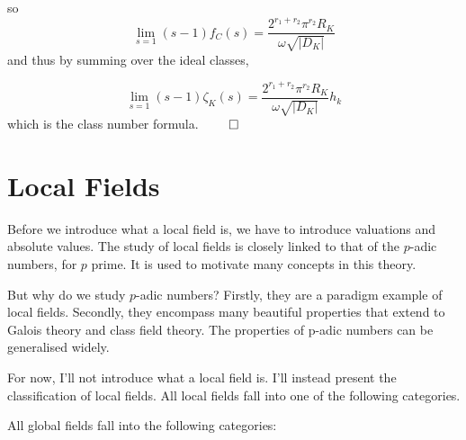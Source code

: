 \documentclass[a4paper, 12pt,oneside,openany]{book}
\begin{document}
so $$\lim\limits_{s=1}(s-1)f_C(s) = \frac{2^{r_1+r_2}\pi^{r_2} R_K}{\omega \sqrt{|D_K|}}$$ and thus by summing over the ideal classes,

$$\lim\limits_{s=1}(s-1)\zeta_K(s) = \frac{2^{r_1+r_2}\pi^{r_2} R_K}{\omega \sqrt{|D_K|}} h_k$$ which is the class number formula. $\qed$



\chapter{Local Fields}
\minitoc

Before we introduce what a local field is, we have to introduce valuations and absolute values. The study of local fields is closely linked to that of the $p$-adic numbers, for $p$ prime. It is used to motivate many concepts in this theory.

But why do we study $p$-adic numbers? Firstly, they are a paradigm example of local fields. Secondly, they encompass many beautiful properties that extend to Galois theory and class field theory. The properties of p-adic numbers can be generalised widely. 

For now, I'll not introduce what a local field is. I'll instead present the classification of local fields. All local fields fall into one of the following categories.

 
 All global fields fall into the following categories:
 
\end{document}
